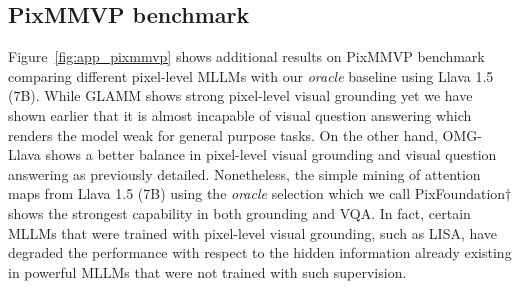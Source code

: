 %

\subsection{PixMMVP benchmark}
Figure~\ref{fig:app_pixmmvp} shows additional results on PixMMVP benchmark comparing different pixel-level MLLMs with our \textit{oracle} baseline using Llava 1.5 (7B). While GLAMM shows strong pixel-level visual grounding yet we have shown earlier that it is almost incapable of visual question answering which renders the model weak for general purpose tasks. On the other hand, OMG-Llava shows a better balance in pixel-level visual grounding and visual question answering as previously detailed. Nonetheless, the simple mining of attention maps from Llava 1.5 (7B) using the \textit{oracle} selection which we call PixFoundation$\dagger$ shows the strongest capability in both grounding and VQA. In fact, certain MLLMs that were trained with pixel-level visual grounding, such as LISA, have degraded the performance with respect to the hidden information already existing in powerful MLLMs that were not trained with such supervision.

